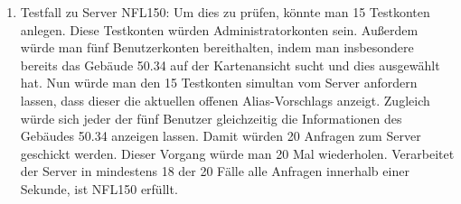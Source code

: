 \begin{enumerate}[label=\textbf{/T\arabic*0/}, align=left]
	\item Testfall zu Server NFL150: Um dies zu prüfen, könnte man 15 Testkonten anlegen. Diese Testkonten würden \Gls{Administrator}konten sein. Außerdem würde man fünf \Gls{Benutzer}konten bereithalten, indem man insbesondere bereits das Gebäude 50.34 auf der \Gls{Kartenansicht} sucht und dies ausgewählt hat. Nun würde man den 15 Testkonten \gls{simultan} vom \Gls{Server} anfordern lassen, dass dieser die aktuellen offenen \Glspl{Alias-Vorschlag} anzeigt. Zugleich würde sich jeder der fünf \Gls{Benutzer} gleichzeitig die Informationen des Gebäudes 50.34 anzeigen lassen. Damit würden 20 Anfragen zum \Gls{Server} geschickt werden. Dieser Vorgang würde man 20 Mal wiederholen. Verarbeitet der \Gls{Server} in mindestens 18 der 20 Fälle alle Anfragen innerhalb einer Sekunde, ist NFL150 erfüllt.
\end{enumerate}